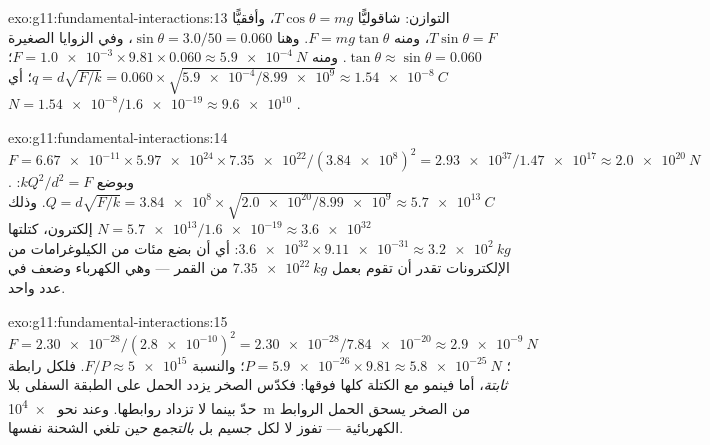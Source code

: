 \begin{solution}{exo:g11:fundamental-interactions:13}
التوازن: شاقوليًّا $T\cos\theta = mg$، وأفقيًّا
$T\sin\theta = F$، ومنه $F = mg\tan\theta$. وهنا
$\sin\theta = 3.0/50 = 0.060$، وفي الزوايا الصغيرة
$\tan\theta \approx \sin\theta = 0.060$. ومنه
$F = \num{1.0e-3} \times 9.81 \times 0.060 \approx \qty{5.9e-4}{N}$؛
$q = d\sqrt{F/k} = 0.060 \times \sqrt{\num{5.9e-4}/\num{8.99e9}}
\approx \qty{1.54e-8}{C}$؛ أي $N = \num{1.54e-8}/\num{1.6e-19} \approx
\num{9.6e10}$ .
\end{solution}

\begin{solution}{exo:g11:fundamental-interactions:14}
$F = \num{6.67e-11} \times \num{5.97e24} \times \num{7.35e22} /
(\num{3.84e8})^2 = \num{2.93e37}/\num{1.47e17} \approx \qty{2.0e20}{N}$.
وبوضع $kQ^2/d^2 = F$:
$Q = d\sqrt{F/k} = \num{3.84e8} \times \sqrt{\num{2.0e20}/\num{8.99e9}}
\approx \qty{5.7e13}{C}$. وذلك
$N = \num{5.7e13}/\num{1.6e-19} \approx \num{3.6e32}$ إلكترون، كتلتها
$\num{3.6e32} \times \num{9.11e-31} \approx \qty{3.2e2}{kg}$: أي أن بضع مئات
من الكيلوغرامات من الإلكترونات تقدر أن تقوم بعمل
$\qty{7.35e22}{kg}$ من القمر --- وهي  الكهرباء وضعف  في عدد واحد.
\end{solution}

\begin{solution}{exo:g11:fundamental-interactions:15}
$F = \num{2.30e-28}/(\num{2.8e-10})^2 = \num{2.30e-28}/\num{7.84e-20}
\approx \qty{2.9e-9}{N}$؛ 
$P = \num{5.9e-26} \times 9.81 \approx \qty{5.8e-25}{N}$؛ والنسبة
$F/P \approx \num{5e15}$. فلكل رابطة  \emph{ثابتة}، أما
 فينمو مع الكتلة كلها فوقها: فكدّس الصخر يزدد الحمل على
الطبقة السفلى بلا حدّ بينما لا تزداد روابطها. وعند نحو
\qty{e4}{m} من الصخر يسحق الحمل الروابط الكهربائية --- 
تفوز لا  لكل جسيم بل \emph{بالتجمع} حين تلغي الشحنة
نفسها.
\end{solution}

